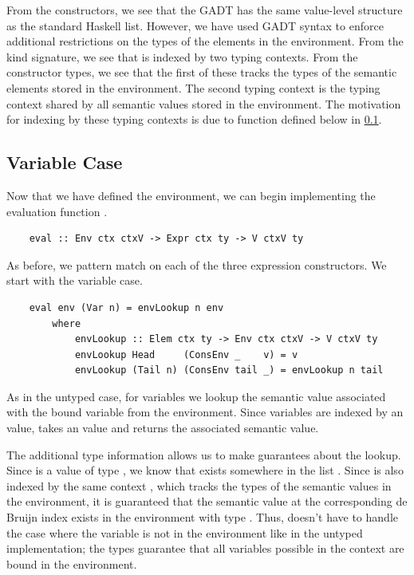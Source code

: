 From the constructors, we see that the  GADT has the same value-level structure as the standard Haskell list. However, we have used GADT syntax to enforce additional restrictions on the types of the elements in the environment. From the kind signature, we see that  is indexed by two typing contexts. From the constructor types, we see that the first of these tracks the types of the semantic elements stored in the environment. The second typing context is the typing context shared by all semantic values stored in the environment. The motivation for indexing  by these typing contexts is due to  function defined below in \ref{subsect:typedVarCase}.



\subsection{Variable Case}
\label{subsect:typedVarCase}

Now that we have defined the environment, we can begin implementing the evaluation function .

\begin{lstlisting}
    eval :: Env ctx ctxV -> Expr ctx ty -> V ctxV ty
\end{lstlisting}

As before, we pattern match on each of the three expression constructors. We start with the variable case.

\begin{lstlisting}
    eval env (Var n) = envLookup n env
        where
            envLookup :: Elem ctx ty -> Env ctx ctxV -> V ctxV ty 
            envLookup Head     (ConsEnv _    v) = v
            envLookup (Tail n) (ConsEnv tail _) = envLookup n tail
\end{lstlisting}

As in the untyped case, for variables we lookup the semantic value associated with the bound variable from the environment. Since variables are indexed by an  value,  takes an  value and returns the associated semantic value.

The additional type information allows us to make guarantees about the lookup. Since  is a value of type , we know that  exists somewhere in the list . Since  is also indexed by the same context , which tracks the types of the semantic values in the environment, it is guaranteed that the semantic value at the corresponding de Bruijn index exists in the environment with type . Thus,  doesn't have to handle the case where the variable is not in the environment like in the untyped implementation; the types guarantee that all variables possible in the context  are bound in the environment.

